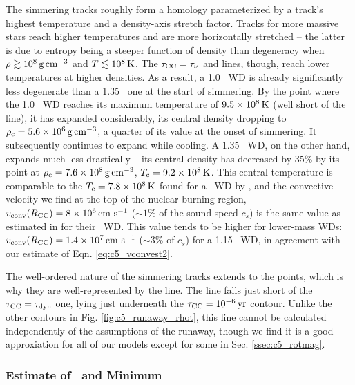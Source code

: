 
The simmering tracks roughly form a homology parameterized by a track's highest temperature and a density-axis stretch factor.  Tracks for more massive stars reach higher temperatures and are more horizontally stretched -- the latter is due to entropy being a steeper function of density than degeneracy when $\rho\gtrsim10^8\,\gcc$ and $T\lesssim10^8\,\mathrm{K}$.  The $\taucc = \taunu$ and \citeal{wooswk04} lines, though, reach lower temperatures at higher densities.  As a result, a 1.0 \Msun\ WD is already significantly less degenerate than a 1.35 \Msun\ one at the start of simmering.  By the point where the 1.0 \Msun\ WD reaches its maximum temperature of $9.5\times10^8\,\mathrm{K}$ (well short of the \citeal{wooswk04} line), it has expanded considerably, its central density dropping to $\rhoc = 5.6\times10^6\,\gcc$, a quarter of its value at the onset of simmering.  It subsequently continues to expand while cooling.  A 1.35 \Msun\ WD, on the other hand, expands much less drastically -- its central density has decreased by 35\% by its \citeal{wooswk04} point at $\rhoc = 7.6\times10^8\,\gcc$, $\Tc = 9.2\times10^8\,\mrm{K}$.  This central temperature is comparable to the $\Tc = 7.8\times10^8\,\mrm{K}$ found for a \Mch\ WD by \citeal{wooswk04}, and the convective velocity we find at the top of the nuclear burning region, $\vconvrcc = 8\times10^6\,\cmpsec$ ($\sim1$\% of the sound speed $c_s$) is the same value as estimated in \citeal{wooswk04} for their \Mch\ WD.  This value tends to be higher for lower-mass WDs: $\vconvrcc = 1.4\times10^7\,\cmpsec$ ($\sim3$\% of $c_s$) for a 1.15 \Msun\ WD, in agreement with our estimate of Eqn. \ref{eq:c5_vconvest2}.

The well-ordered nature of the simmering tracks extends to the \citeal{wooswk04} points, which is why they are well-represented by the \citeal{wooswk04} line.  The line falls just short of the $\taucc = \taudyn$ one, lying just underneath the $\taucc = 10^{-6}\,\mrm{yr}$ contour.  Unlike the other contours in Fig. \ref{fig:c5_runaway_rhot}, this line cannot be calculated independently of the assumptions of the runaway, though we find it is a good approxiation for all of our models except for some in Sec. \ref{ssec:c5_rotmag}.

\subsubsection{Estimate of \Mcrit\ and Minimum \MNi}
\label{sssec:c5_mcritest_adiabatic}

